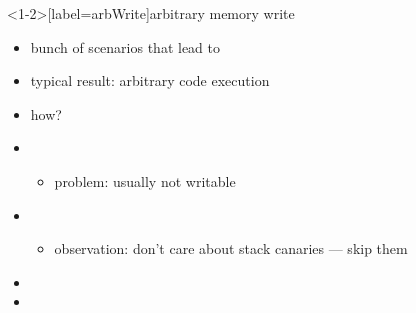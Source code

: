 
\begin{frame}<1-2>[label=arbWrite]{arbitrary memory write}
    \begin{itemize}
    \item bunch of scenarios that lead to 
    \item typical result: arbitrary code execution
    \item how?
    \vspace{.5cm}
    \item<2-> 
        \begin{itemize}
        \item problem: usually not writable
        \end{itemize}
    \item<2-> 
        \begin{itemize}
        \item observation: don't care about stack canaries --- skip them
        \end{itemize}
    \item<2-> 
    \item<2-> 
    \end{itemize}
\end{frame}
